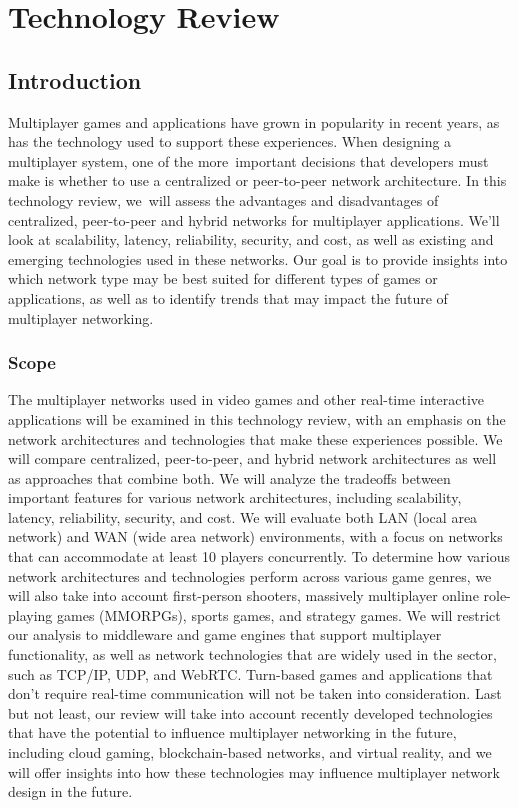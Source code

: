 \chapter{Technology Review}
\section{Introduction}
Multiplayer games and applications have grown in popularity in recent years, as has the technology used to support these experiences. When designing a multiplayer system, one of the more important decisions that developers must make is whether to use a centralized or peer-to-peer network architecture. In this technology review, we will assess the advantages and disadvantages of centralized, peer-to-peer and hybrid networks for multiplayer applications. We'll look at scalability, latency, reliability, security, and cost, as well as existing and emerging technologies used in these networks. Our goal is to provide insights into which network type may be best suited for different types of games or applications, as well as to identify trends that may impact the future of multiplayer networking.

\subsection{Scope}
The multiplayer networks used in video games and other real-time interactive applications will be examined in this technology review, with an emphasis on the network architectures and technologies that make these experiences possible. We will compare centralized, peer-to-peer, and hybrid network architectures as well as approaches that combine both. We will analyze the tradeoffs between important features for various network architectures, including scalability, latency, reliability, security, and cost.
We will evaluate both LAN (local area network) and WAN (wide area network) environments, with a focus on networks that can accommodate at least 10 players concurrently. To determine how various network architectures and technologies perform across various game genres, we will also take into account first-person shooters, massively multiplayer online role-playing games (MMORPGs), sports games, and strategy games.
We will restrict our analysis to middleware and game engines that support multiplayer functionality, as well as network technologies that are widely used in the sector, such as TCP/IP, UDP, and WebRTC. Turn-based games and applications that don't require real-time communication will not be taken into consideration.
Last but not least, our review will take into account recently developed technologies that have the potential to influence multiplayer networking in the future, including cloud gaming, blockchain-based networks, and virtual reality, and we will offer insights into how these technologies may influence multiplayer network design in the future.

